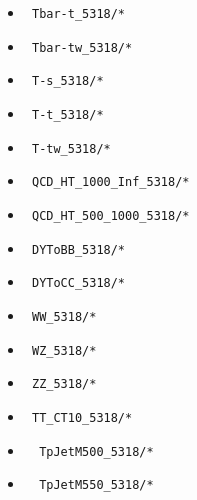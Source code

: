 \documentclass[11pt,a4paper]{article}
\begin{document}
\begin{itemize}
\begin{itemize}
  \item \begin{verbatim} Tbar-t_5318/* \end{verbatim}
  \item \begin{verbatim} Tbar-tw_5318/* \end{verbatim}
  \item \begin{verbatim} T-s_5318/* \end{verbatim}
  \item \begin{verbatim} T-t_5318/* \end{verbatim}
  \item \begin{verbatim} T-tw_5318/* \end{verbatim}
  \item \begin{verbatim} QCD_HT_1000_Inf_5318/* \end{verbatim}
  \item \begin{verbatim} QCD_HT_500_1000_5318/* \end{verbatim}
  \item \begin{verbatim} DYToBB_5318/* \end{verbatim}
  \item \begin{verbatim} DYToCC_5318/* \end{verbatim}
  \item \begin{verbatim} WW_5318/* \end{verbatim}
  \item \begin{verbatim} WZ_5318/* \end{verbatim}
  \item \begin{verbatim} ZZ_5318/* \end{verbatim}
  \item \begin{verbatim} TT_CT10_5318/* \end{verbatim}
  \item \begin{verbatim}  TpJetM500_5318/* \end{verbatim}
  \item \begin{verbatim}  TpJetM550_5318/* \end{verbatim}

\end{itemize}
\end{itemize}
\end{document}
